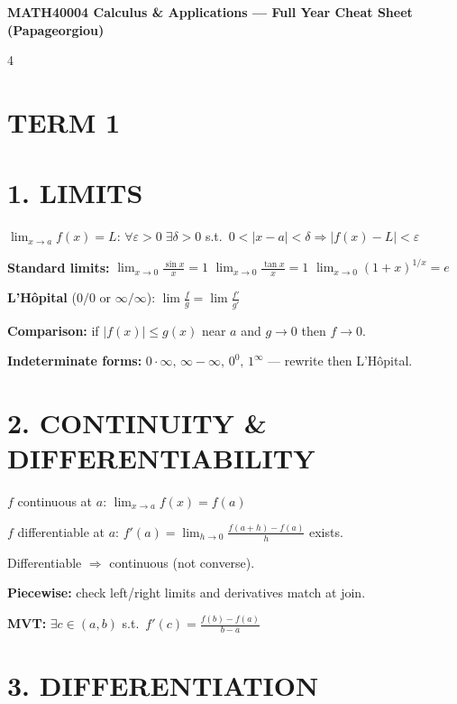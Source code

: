 \documentclass[8pt,a4paper,landscape]{extarticle}
\begin{document}
\begin{center}{\small\textbf{MATH40004 Calculus \& Applications --- Full Year Cheat Sheet (Papageorgiou)}}\end{center}
\vspace{-4pt}
\begin{multicols}{4}

\section*{TERM 1}

\section*{1. LIMITS}

$\lim_{x\to a}f(x)=L$: $\forall\varepsilon>0\;\exists\delta>0$ s.t.\ $0<|x-a|<\delta\Rightarrow|f(x)-L|<\varepsilon$

\textbf{Standard limits:}
$\lim_{x\to0}\frac{\sin x}{x}=1$\quad
$\lim_{x\to0}\frac{\tan x}{x}=1$\quad
$\lim_{x\to0}(1+x)^{1/x}=e$

\textbf{L'H\^opital} ($0/0$ or $\infty/\infty$): $\lim\frac{f}{g}=\lim\frac{f'}{g'}$

\textbf{Comparison:} if $|f(x)|\leq g(x)$ near $a$ and $g\to0$ then $f\to0$.

\textbf{Indeterminate forms:} $0\cdot\infty,\,\infty-\infty,\,0^0,\,1^\infty$ --- rewrite then L'H\^opital.

\section*{2. CONTINUITY \& DIFFERENTIABILITY}

$f$ continuous at $a$: $\lim_{x\to a}f(x)=f(a)$

$f$ differentiable at $a$: $f'(a)=\lim_{h\to0}\frac{f(a+h)-f(a)}{h}$ exists.

Differentiable $\Rightarrow$ continuous (not converse).

\textbf{Piecewise:} check left/right limits and derivatives match at join.

\textbf{MVT:} $\exists c\in(a,b)$ s.t.\ $f'(c)=\frac{f(b)-f(a)}{b-a}$

\section*{3. DIFFERENTIATION}


\end{multicols}
\end{document}
